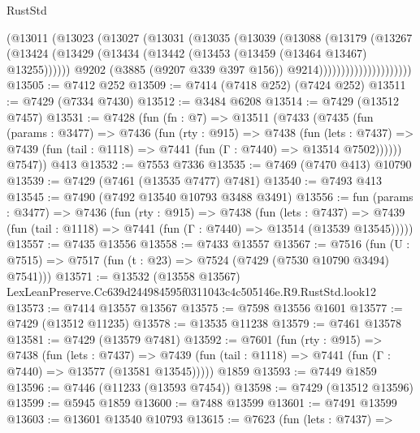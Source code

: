 \begin{lexlean}{RustStd}
\begin{coremodule}
                            (@13011
                              (@13023
                                (@13027
                                  (@13031
                                    (@13035
                                      (@13039
                                        (@13088
                                          (@13179
                                            (@13267
                                              (@13424
                                                (@13429
                                                  (@13434
                                                    (@13442
                                                      (@13453 (@13459 (@13464 @13467) @13255))))))
                                              @9202
                                              (@3885 (@9207 @339 @397 @156))
                                              @9214)))))))))))))))))))))
@13505 := @7412 @252
@13509 := @7414 (@7418 @252) (@7424 @252)
@13511 := @7429 (@7334 @7430)
@13512 := @3484 @6208
@13514 := @7429 (@13512 @7457)
@13531 := @7428
    (fun (fn : @7) =>
    @13511
      (@7433
        (@7435
          (fun (params : @3477) =>
          @7436
            (fun (rty : @915) =>
            @7438
              (fun (lets : @7437) =>
              @7439 (fun (tail : @1118) => @7441 (fun (Γ : @7440) => @13514 @7502))))))
        @7547))
    @413
@13532 := @7553 @7336
@13535 := @7469 (@7470 @413) @10790
@13539 := @7429 (@7461 (@13535 @7477) @7481)
@13540 := @7493 @413
@13545 := @7490 (@7492 @13540 @10793 @3488 @3491)
@13556 := fun (params : @3477) =>
  @7436
    (fun (rty : @915) =>
    @7438
      (fun (lets : @7437) =>
      @7439 (fun (tail : @1118) => @7441 (fun (Γ : @7440) => @13514 (@13539 @13545)))))
@13557 := @7435 @13556
@13558 := @7433 @13557
@13567 := @7516
    (fun (U : @7515) => @7517 (fun (t : @23) => @7524 (@7429 (@7530 @10790 @3494) @7541)))
@13571 := @13532 (@13558 @13567) LexLeanPreserve.Cc639d244984595f0311043c4c505146e.R9.RustStd.look12
@13573 := @7414 @13557 @13567
@13575 := @7598 @13556 @1601
@13577 := @7429 (@13512 @11235)
@13578 := @13535 @11238
@13579 := @7461 @13578
@13581 := @7429 (@13579 @7481)
@13592 := @7601
    (fun (rty : @915) =>
    @7438
      (fun (lets : @7437) =>
      @7439 (fun (tail : @1118) => @7441 (fun (Γ : @7440) => @13577 (@13581 @13545)))))
    @1859
@13593 := @7449 @1859
@13596 := @7446 (@11233 (@13593 @7454))
@13598 := @7429 (@13512 @13596)
@13599 := @5945 @1859
@13600 := @7488 @13599
@13601 := @7491 @13599
@13603 := @13601 @13540 @10793
@13615 := @7623
    (fun (lets : @7437) =>

\end{coremodule}
\end{lexlean}
